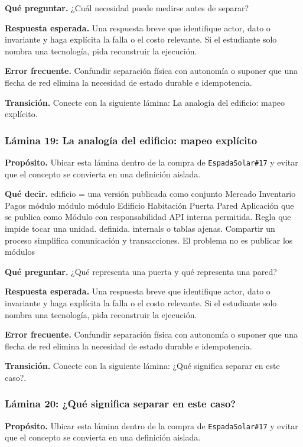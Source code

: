 \documentclass[variant=docente,cover=institutional,mode=screen]{ua-engineering-v6-article}
\begin{document}
\textbf{Qué preguntar.} ¿Cuál necesidad puede medirse antes de separar?

\textbf{Respuesta esperada.} Una respuesta breve que identifique actor, dato o invariante y haga explícita la falla o el costo relevante. Si el estudiante solo nombra una tecnología, pida reconstruir la ejecución.

\textbf{Error frecuente.} Confundir separación física con autonomía o suponer que una flecha de red elimina la necesidad de estado durable e idempotencia.

\textbf{Transición.} Conecte con la siguiente lámina: La analogía del edificio: mapeo explícito.

\subsubsection*{Lámina 19: La analogía del edificio: mapeo explícito}
\textbf{Propósito.} Ubicar esta lámina dentro de la compra de \texttt{EspadaSolar\#17} y evitar que el concepto se convierta en una definición aislada.

\textbf{Qué decir.} edificio = una versión publicada como conjunto Mercado Inventario Pagos módulo módulo módulo Edificio Habitación Puerta Pared Aplicación que se publica como Módulo con responsabilidad API interna permitida. Regla que impide tocar una unidad. definida. internals o tablas ajenas. Compartir un proceso simplifica comunicación y transacciones. El problema no es publicar los módulos 

\textbf{Qué preguntar.} ¿Qué representa una puerta y qué representa una pared?

\textbf{Respuesta esperada.} Una respuesta breve que identifique actor, dato o invariante y haga explícita la falla o el costo relevante. Si el estudiante solo nombra una tecnología, pida reconstruir la ejecución.

\textbf{Error frecuente.} Confundir separación física con autonomía o suponer que una flecha de red elimina la necesidad de estado durable e idempotencia.

\textbf{Transición.} Conecte con la siguiente lámina: ¿Qué significa separar en este caso?.

\subsubsection*{Lámina 20: ¿Qué significa separar en este caso?}
\textbf{Propósito.} Ubicar esta lámina dentro de la compra de \texttt{EspadaSolar\#17} y evitar que el concepto se convierta en una definición aislada.
\end{document}
